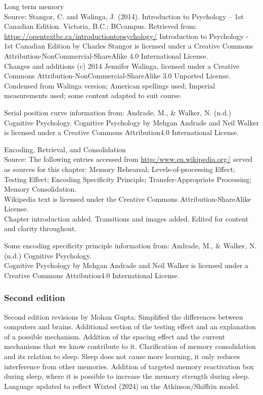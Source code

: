 \documentclass[
]{krantz}
\begin{document}
Long term memory\\
Source: Stangor, C. and Walinga, J. (2014). Introduction to Psychology -- 1st Canadian Edition. Victoria, B.C.: BCcampus. Retrieved from: \url{https://opentextbc.ca/introductiontopsychology/}
Introduction to Psychology - 1st Canadian Edition by Charles Stangor is licensed under a Creative Commons Attribution-NonCommercial-ShareAlike 4.0 International License.\\
Changes and additions (c) 2014 Jennifer Walinga, licensed under a Creative Commons Attribution-NonCommercial-ShareAlike 3.0 Unported License.\\
Condensed from Walinga version; American spellings used; Imperial measurements used; some content adapted to suit course.

Serial position curve information from: Andrade, M., \& Walker, N. (n.d.) Cognitive Psychology.
Cognitive Psychology by Mehgan Andrade and Neil Walker is licensed under a Creative Commons Attribution4.0 International License.

Encoding, Retrieval, and Consolidation\\
Source: The following entries accessed from \url{http:/www.en.wikipedia.org/} served as sources for this chapter: Memory Rehearsal; Levels-of-processing Effect; Testing Effect; Encoding Specificity Principle; Transfer-Appropriate Processing; Memory Consolidation.\\
Wikipedia text is licensed under the Creative Commons Attribution-ShareAlike License.\\
Chapter introduction added. Transitions and images added. Edited for content and clarity throughout.

Some encoding specificity principle information from: Andrade, M., \& Walker, N. (n.d.) Cognitive Psychology.\\
Cognitive Psychology by Mehgan Andrade and Neil Walker is licensed under a Creative Commons Attribution4.0 International License.\\

\subsubsection*{Second edition}\label{second-edition-5}


Second edition revisions by Mohan Gupta: Simplified the differences between computers and brains. Additional section of the testing effect and an explanation of a possible mechanism. Addition of the spacing effect and the current mechanisms that we know contribute to it. Clarification of memory consolidation and its relation to sleep. Sleep does not cause more learning, it only reduces interference from other memories. Addition of targeted memory reactivation box during sleep, where it is possible to increase the memory strength during sleep. Language updated to reflect Wixted (2024) on the Atkinson/Shiffrin model.
\end{document}
